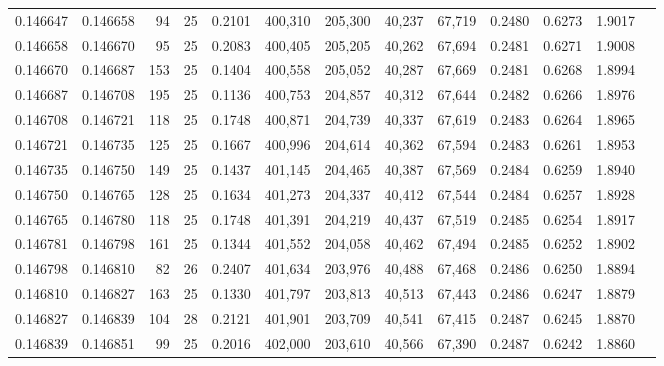 \begin{tabular}{rrrrrrrrrrrrr}
0.146647 & 0.146658 &    94 &  25 &                                     0.2101 & 400,310 & 205,300 &  40,237 &  67,719 & 0.2480 & 0.6273 & 1.9017 \\
0.146658 & 0.146670 &    95 &  25 &                                     0.2083 & 400,405 & 205,205 &  40,262 &  67,694 & 0.2481 & 0.6271 & 1.9008 \\
0.146670 & 0.146687 &   153 &  25 &                                     0.1404 & 400,558 & 205,052 &  40,287 &  67,669 & 0.2481 & 0.6268 & 1.8994 \\
0.146687 & 0.146708 &   195 &  25 &                                     0.1136 & 400,753 & 204,857 &  40,312 &  67,644 & 0.2482 & 0.6266 & 1.8976 \\
0.146708 & 0.146721 &   118 &  25 &                                     0.1748 & 400,871 & 204,739 &  40,337 &  67,619 & 0.2483 & 0.6264 & 1.8965 \\
0.146721 & 0.146735 &   125 &  25 &                                     0.1667 & 400,996 & 204,614 &  40,362 &  67,594 & 0.2483 & 0.6261 & 1.8953 \\
0.146735 & 0.146750 &   149 &  25 &                                     0.1437 & 401,145 & 204,465 &  40,387 &  67,569 & 0.2484 & 0.6259 & 1.8940 \\
0.146750 & 0.146765 &   128 &  25 &                                     0.1634 & 401,273 & 204,337 &  40,412 &  67,544 & 0.2484 & 0.6257 & 1.8928 \\
0.146765 & 0.146780 &   118 &  25 &                                     0.1748 & 401,391 & 204,219 &  40,437 &  67,519 & 0.2485 & 0.6254 & 1.8917 \\
0.146781 & 0.146798 &   161 &  25 &                                     0.1344 & 401,552 & 204,058 &  40,462 &  67,494 & 0.2485 & 0.6252 & 1.8902 \\
0.146798 & 0.146810 &    82 &  26 &                                     0.2407 & 401,634 & 203,976 &  40,488 &  67,468 & 0.2486 & 0.6250 & 1.8894 \\
0.146810 & 0.146827 &   163 &  25 &                                     0.1330 & 401,797 & 203,813 &  40,513 &  67,443 & 0.2486 & 0.6247 & 1.8879 \\
0.146827 & 0.146839 &   104 &  28 &                                     0.2121 & 401,901 & 203,709 &  40,541 &  67,415 & 0.2487 & 0.6245 & 1.8870 \\
0.146839 & 0.146851 &    99 &  25 &                                     0.2016 & 402,000 & 203,610 &  40,566 &  67,390 & 0.2487 & 0.6242 & 1.8860 \\

\end{tabular}
